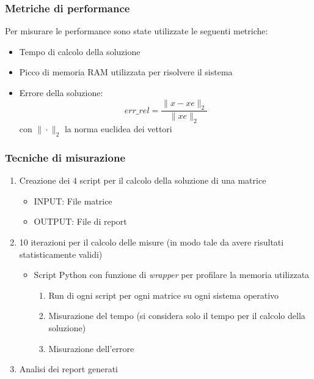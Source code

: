 \documentclass{beamer}
\begin{document}
\begin{frame}
	\frametitle{Metriche di performance}
	Per misurare le performance sono state utilizzate le seguenti metriche:
	\begin{itemize}
		\item Tempo di calcolo della soluzione
		\item Picco di memoria RAM utilizzata per risolvere il sistema
		\item Errore della soluzione: \[err \_ rel = \frac{\|x - xe\|_2}{\|xe\|_2}\]
		con $\| \cdot \|_2$ la norma euclidea dei vettori
	\end{itemize}
	\end{frame}

\begin{frame}

	\frametitle{Tecniche di misurazione}
		\begin{enumerate}
		\item Creazione dei 4 script per il calcolo della soluzione di una matrice
		\begin{itemize}
			\item INPUT: File matrice
			\item OUTPUT: File di report
		\end{itemize}

		\item 10 iterazioni per il calcolo delle misure (in modo tale da avere risultati statisticamente validi)

		\begin{itemize}
			\item Script Python con funzione di \textit{wrapper} per profilare la memoria utilizzata
			\begin{enumerate}
				\item Run di ogni script per ogni matrice su ogni sistema operativo

					\item Misurazione del tempo (si considera solo il tempo per il calcolo della soluzione)
					\item Misurazione dell'errore

			\end{enumerate}

		\end{itemize}


		\item Analisi dei report generati

	\end{enumerate}
\end{frame}
\end{document}
